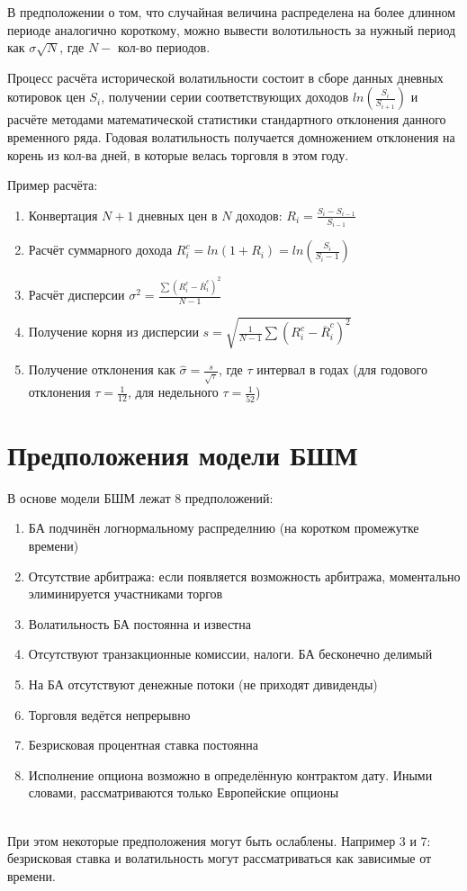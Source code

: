 \documentclass{article}
\begin{document}
В предположении о том, что случайная величина распределена на более длинном периоде аналогично короткому, можно вывести волотильность за нужный период как $\sigma \sqrt{N}$, где $N -$ кол-во периодов.

Процесс расчёта исторической волатильности состоит в сборе данных дневных котировок цен $S_i$, получении серии соответствующих доходов $ln(\frac{S_i}{S_{i+1}})$ и расчёте методами математической статистики стандартного отклонения данного временного ряда. Годовая волатильность получается домножением отклонения на корень из кол-ва дней, в которые велась торговля в этом году.

Пример расчёта:
\begin{enumerate}
\item Конвертация $N+1$ дневных цен в $N$ доходов: $R_i=\frac{S_i-S_{i-1}}{S_{i-1}}$
\item Расчёт суммарного дохода $R_i^c=ln(1+R_i)=ln(\frac{S_i}{S_i-1})$
\item Расчёт дисперсии $\sigma^2=\frac{\sum(R_i^c-\overline{R}_i^c)^2}{N-1}$
\item Получение корня из дисперсии $s=\sqrt{\frac{1}{N-1}\sum(R_i^c-\overline{R}_i^c)^2}$
\item Получение отклонения как $\hat{\sigma}=\frac{s}{\sqrt{\tau}}$, где $\tau$ интервал в годах (для годового отклонения $\tau=\frac{1}{12}$, для недельного $\tau=\frac{1}{52}$)
\end{enumerate}


\section{Предположения модели БШМ}
В основе модели БШМ лежат 8 предположений:
\begin{enumerate}
\item БА подчинён логнормальному распределнию (на коротком промежутке времени)
\item Отсутствие арбитража: если появляется возможность арбитража, моментально элиминируется участниками торгов
\item Волатильность БА постоянна и известна
\item Отсутствуют транзакционные комиссии, налоги. БА бесконечно делимый
\item На БА отсутствуют денежные потоки (не приходят дивиденды)
\item Торговля ведётся непрерывно
\item Безрисковая процентная ставка постоянна
\item Исполнение опциона возможно в определённую контрактом дату. Иными словами, рассматриваются только Европейские опционы
\end{enumerate}\\
При этом некоторые предположения могут быть ослаблены. Например 3 и 7: безрисковая ставка и волатильность могут рассматриваться как зависимые от времени.
\end{document}
